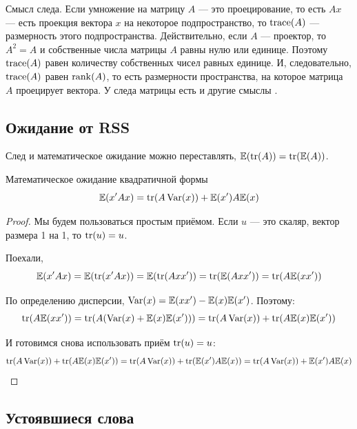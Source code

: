 \documentclass[12pt, a4paper]{article}\usepackage[]{graphicx}\usepackage[]{color}
\begin{document}
Смысл следа. Если умножение на матрицу $A$ — это проецирование, то есть $Ax$ — есть проекция вектора $x$ на некоторое подпространство, то $\operatorname{trace}(A)$ — размерность этого подпространства. Действительно, если $A$ — проектор, то $A^2=A$ и собственные числа матрицы $A$ равны нулю или единице. Поэтому $\operatorname{trace}(A)$ равен количеству собственных чисел равных единице. И, следовательно, $\operatorname{trace}(A)$ равен $\operatorname{rank}(A)$, то есть размерности пространства, на которое матрица $A$ проецирует вектора. У следа матрицы есть и другие смыслы \autocite{mathoverflow0trace}.


\subsection{Ожидание от RSS}

\begin{theorem}
След и математическое ожидание можно переставлять, $\mathbb{E}(\operatorname{tr}(A))=\operatorname{tr}(\mathbb{E}(A))$.
\end{theorem}

\begin{theorem}
Математическое ожидание квадратичной формы
\begin{equation}
\mathbb{E}(x'Ax)=\operatorname{tr}(A\operatorname{Var}(x))+\mathbb{E}(x')A\mathbb{E}(x)
\end{equation}
\end{theorem}
\begin{proof}
Мы будем пользоваться простым приёмом. Если $u$ — это скаляр, вектор размера 1 на 1, то $\operatorname{tr}(u)=u$.

Поехали,
\begin{equation}
\mathbb{E}(x'Ax)=\mathbb{E}(\operatorname{tr}(x'Ax))=\mathbb{E}(\operatorname{tr}(Axx'))=\operatorname{tr}(\mathbb{E}(Axx'))=\operatorname{tr}(A\mathbb{E}(xx'))
\end{equation}

По определению дисперсии, $\operatorname{Var}(x)=\mathbb{E}(xx')-\mathbb{E}(x)\mathbb{E}(x')$. Поэтому:
\begin{equation}
\operatorname{tr}(A\mathbb{E}(xx'))=\operatorname{tr}(A(\operatorname{Var}(x)+\mathbb{E}(x)\mathbb{E}(x')))=\operatorname{tr}(A\operatorname{Var}(x))+\operatorname{tr}(A\mathbb{E}(x)\mathbb{E}(x'))
\end{equation}

И готовимся снова использовать приём $\operatorname{tr}(u)=u$:
\begin{equation}
\operatorname{tr}(A\operatorname{Var}(x))+\operatorname{tr}(A\mathbb{E}(x)\mathbb{E}(x'))=\operatorname{tr}(A\operatorname{Var}(x))+\operatorname{tr}(\mathbb{E}(x')A\mathbb{E}(x))=
\operatorname{tr}(A\operatorname{Var}(x))+\mathbb{E}(x')A\mathbb{E}(x)
\end{equation}

\end{proof}


\subsection{Устоявшиеся слова}
\end{document}
